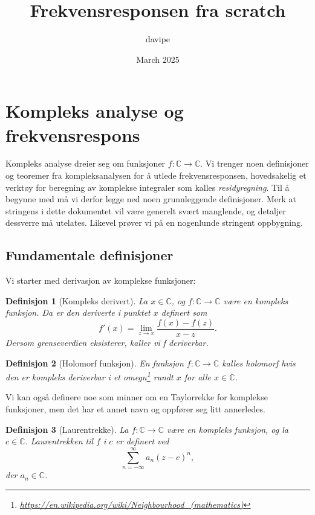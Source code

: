 \documentclass{article}
\title{Frekvensresponsen fra scratch}
\author{davipe }
\date{March 2025}
\newtheorem{definition}{Definisjon}
\begin{document}
\maketitle

\section{Kompleks analyse og frekvensrespons}

Kompleks analyse dreier seg om funksjoner $f:\mathbb{C} \longrightarrow \mathbb{C}$. Vi trenger noen definisjoner og teoremer fra kompleksanalysen for å utlede frekvensresponsen, hovedsakelig et verktøy for beregning av komplekse integraler som kalles \textit{residyregning}. Til å begynne med må vi derfor legge ned noen grunnleggende definisjoner. Merk at stringens i dette dokumentet vil være generelt svært manglende, og detaljer dessverre må utelates. Likevel prøver vi på en nogenlunde stringent oppbygning.

\subsection{Fundamentale definisjoner}

Vi starter med derivasjon av komplekse funksjoner:

\begin{definition}[Kompleks derivert]
    La $x \in \mathbb{C}$, og $f:\mathbb{C} \longrightarrow \mathbb{C}$ være en kompleks funksjon. Da er den deriverte i punktet $x$ definert som \[f'(x) =  \lim_{z \to x} \frac{f(x) - f(z)}{x - z}. \] Dersom grenseverdien eksisterer, kaller vi f deriverbar.
\end{definition}

\begin{definition}[Holomorf funksjon]
    En funksjon $f:\mathbb{C} \longrightarrow \mathbb{C}$ kalles holomorf hvis den er kompleks deriverbar i et omegn\footnote{\url{https://en.wikipedia.org/wiki/Neighbourhood_(mathematics)}} rundt $x$ for alle $x\in\mathbb{C}$.
\end{definition}

Vi kan også definere noe som minner om en Taylorrekke for komplekse funksjoner, men det har et annet navn og oppfører seg litt annerledes.

\begin{definition}[Laurentrekke]
    La $f: \mathbb{C} \longrightarrow \mathbb{C}$ være en kompleks funksjon, og la $c \in \mathbb{C}$. Laurentrekken til $f$ i $c$ er definert ved \[
    \sum_{n=-\infty}^\infty a_n (z - c)^n,
    \] der $a_n \in \mathbb{C}$.
\end{definition}
\end{document}

